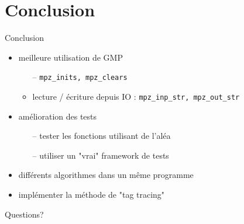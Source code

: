 \documentclass{beamer}
\begin{document}
  \section{Conclusion}

  \begin{frame}{Conclusion}
    \begin{itemize}
      \item meilleure utilisation de GMP
        \begin{itemize}
          \item[--] \lstinline{mpz_inits, mpz_clears}
          \item[--] lecture / écriture depuis IO : \lstinline{mpz_inp_str, mpz_out_str}
        \end{itemize}
      \item amélioration des tests
        \begin{itemize}
          \item[--] tester les fonctions utilisant de l'aléa
          \item[--] utiliser un "vrai" framework de tests
        \end{itemize}
      \item différents algorithmes dans un même programme
      \item implémenter la méthode de "tag tracing"
    \end{itemize}
  \end{frame}

  {
  \begin{frame}[standout]
    Questions?
  \end{frame}
  }
\end{document}
